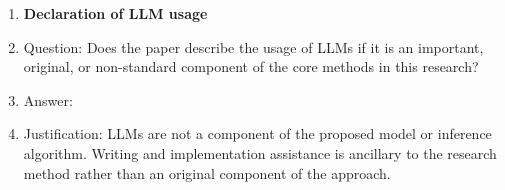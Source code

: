 \begin{enumerate}
\item {\bf Declaration of LLM usage}
    \item[] Question: Does the paper describe the usage of LLMs if it is an important, original, or non-standard component of the core methods in this research?
    \item[] Answer: \answerNA{}
    \item[] Justification: LLMs are not a component of the proposed model or inference algorithm.
    Writing and implementation assistance is ancillary to the research
    method rather than an original component of the approach.

\end{enumerate}

